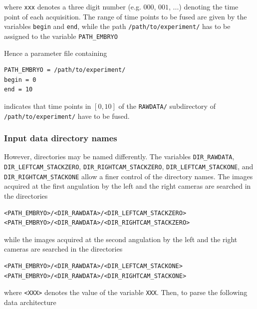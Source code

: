 \mbox{}
\mbox{}

where \texttt{xxx} denotes a three digit number (e.g. $000$, $001$,
...) denoting the time point of each acquisition. The range of time
points to be fused are given by the variables \texttt{begin} and
\texttt{end}, while the path \texttt{/path/to/experiment/} has to be
assigned to the variable \texttt{PATH\_EMBRYO} 

Hence a parameter file containing
\begin{verbatim}
PATH_EMBRYO = /path/to/experiment/
begin = 0
end = 10
\end{verbatim}
indicates that time points in $[0,10]$ of the \texttt{RAWDATA/}
subdirectory of  \texttt{/path/to/experiment/} have to be fused.

\subsubsection{Input data directory names}

However, directories may be named differently. The variables
\texttt{DIR\_RAWDATA}, \texttt{DIR\_LEFTCAM\_STACKZERO},
\texttt{DIR\_RIGHTCAM\_STACKZERO}, \texttt{DIR\_LEFTCAM\_STACKONE},
and \texttt{DIR\_RIGHTCAM\_STACKONE} allow a finer control of the
directory names. The images acquired at the first angulation by the
left and the right cameras are searched in the directories
\begin{verbatim}
<PATH_EMBRYO>/<DIR_RAWDATA>/<DIR_LEFTCAM_STACKZERO>
<PATH_EMBRYO>/<DIR_RAWDATA>/<DIR_RIGHTCAM_STACKZERO>
\end{verbatim}
while the images acquired at the second angulation by the
left and the right cameras are searched in the directories
\begin{verbatim}
<PATH_EMBRYO>/<DIR_RAWDATA>/<DIR_LEFTCAM_STACKONE>
<PATH_EMBRYO>/<DIR_RAWDATA>/<DIR_RIGHTCAM_STACKONE>
\end{verbatim}
where \texttt{<XXX>} denotes the value of the variable \texttt{XXX}.
Then, to parse the following data architecture

\mbox{}
\mbox{}

